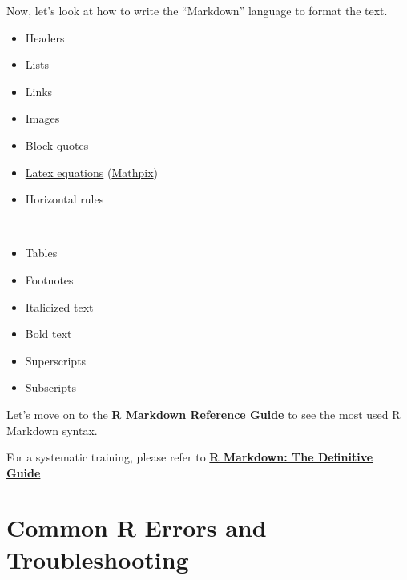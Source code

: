 \documentclass[
  11pt,
]{book}
\providecommand{\tightlist}{%
  \setlength{\itemsep}{0pt}\setlength{\parskip}{0pt}}
\begin{document}
Now, let's look at how to write the ``Markdown'' language to format the text.

\begin{cols}

\begin{col}{0.45\textwidth}

\begin{itemize}
\tightlist
\item
  Headers
\item
  Lists
\item
  Links
\item
  Images
\item
  Block quotes
\item
  \href{https://www.docx2latex.com/tutorials/Mathematical-equations-LaTeX.html/}{Latex equations} (\href{https://mathpix.com}{Mathpix})
\item
  Horizontal rules
\end{itemize}

\end{col}

\begin{col}{0.1\textwidth}
~

\end{col}

\begin{col}{0.45\textwidth}

\begin{itemize}
\tightlist
\item
  Tables
\item
  Footnotes
\item
  Italicized text
\item
  Bold text
\item
  Superscripts
\item
  Subscripts
\end{itemize}

\end{col}

\end{cols}

\hfill\break

Let's move on to the \textbf{R Markdown Reference Guide} to see the most used R Markdown syntax.

For a systematic training, please refer to \href{https://bookdown.org/yihui/rmarkdown/}{\textbf{R Markdown: The Definitive Guide}}

\hypertarget{common-r-errors-and-troubleshooting}{%
\chapter{Common R Errors and Troubleshooting}\label{common-r-errors-and-troubleshooting}}
\end{document}
